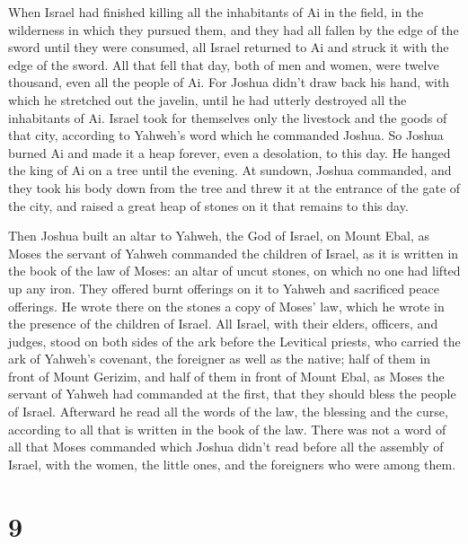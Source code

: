  When Israel had finished killing all the inhabitants of Ai
in the field, in the wilderness in which they pursued them, and they had
all fallen by the edge of the sword until they were consumed, all Israel
returned to Ai and struck it with the edge of the sword. 
All that fell that day, both of men and women, were twelve thousand,
even all the people of Ai.  For Joshua didn't draw back his
hand, with which he stretched out the javelin, until he had utterly
destroyed all the inhabitants of Ai.  Israel took for
themselves only the livestock and the goods of that city, according to
Yahweh's word which he commanded Joshua.  So Joshua burned
Ai and made it a heap forever, even a desolation, to this day.
 He hanged the king of Ai on a tree until the evening. At
sundown, Joshua commanded, and they took his body down from the tree and
threw it at the entrance of the gate of the city, and raised a great
heap of stones on it that remains to this day.

 Then Joshua built an altar to Yahweh, the God of Israel,
on Mount Ebal,  as Moses the servant of Yahweh commanded
the children of Israel, as it is written in the book of the law of
Moses: an altar of uncut stones, on which no one had lifted up any iron.
They offered burnt offerings on it to Yahweh and sacrificed peace
offerings.  He wrote there on the stones a copy of Moses'
law, which he wrote in the presence of the children of Israel.
 All Israel, with their elders, officers, and judges, stood
on both sides of the ark before the Levitical priests, who carried the
ark of Yahweh's covenant, the foreigner as well as the native; half of
them in front of Mount Gerizim, and half of them in front of Mount Ebal,
as Moses the servant of Yahweh had commanded at the first, that they
should bless the people of Israel.  Afterward he read all
the words of the law, the blessing and the curse, according to all that
is written in the book of the law.  There was not a word of
all that Moses commanded which Joshua didn't read before all the
assembly of Israel, with the women, the little ones, and the foreigners
who were among them.

\hypertarget{section-8}{%
\section{9}\label{section-8}}

